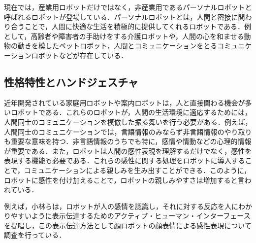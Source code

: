 現在では，産業用ロボットだけではなく，非産業用であるパーソナルロボットと呼ばれるロボットが登場している．パーソナルロボットとは，人間と密接に関わり合うことで，人間に快適な生活を積極的に提供してくれるロボットである\cite{perso}．例として，高齢者や障害者の手助けをする介護ロボットや，人間の心を和ませる動物の動きを模したペットロボット，人間とコミュニケーションをとるコミュニケーションロボットなどが存在している．




\subsection{性格特性とハンドジェスチャ}
\label{sec2.3.2}

近年開発されている家庭用ロボットや案内ロボットは，人と直接関わる機会が多いロボットである．これらのロボットが，人間の生活環境に適応するためには，人間同士のコミュニケーションを模倣した振る舞いを行う必要がある．例えば，人間同士のコミュニケーションでは，言語情報のみならず非言語情報のやり取りも重要な意味を持つ\cite{gengo}．非言語情報のうちでも特に，感情や情動などの心理的情報が重要である．また，ロボットは人間の感性表現を理解するだけでなく，感性を表現する機能も必要である．これらの感性に関する処理をロボットに導入することで，コミュニケーションによる親しみを生み出すことができる．このように，ロボットに感性を付け加えることで，ロボットの親しみやすさは増加すると言われている．

例えば，小林らは，ロボットが人の感情を認識し，それに対する反応を人にわかりやすいように表示伝達するためのアクティブ・ヒューマン・インターフェースを提唱し，この表示伝達方法として顔ロボットの顔表情による感性表現について調査を行っている\cite{gengo}．






\vspace{1cm}
\begin{figure}[!h]
 \begin{center}
  \centering
  \label{fig:kansei}
 \end{center}
\end{figure}

